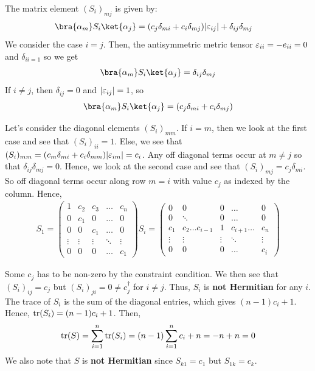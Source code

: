 \documentclass[12pt]{article}
\begin{document}
\begin{ans}
The matrix element $(S_i)_{mj}$ is given by:
\begin{align*}
    \bra{\alpha_m }S_i \ket{\alpha_j}
    &= (c_j \delta_{mi} + c_i \delta_{mj})|\e_{ij}| + \delta_{ij}\delta_{mj} 
\end{align*}
We consider the case $i =j$. Then, the antisymmetric metric tensor $\varepsilon_{ii} = -e_{ii} = 0$ and $\delta_{ii = 1}$ so we get 
\[ \bra{\alpha_m }S_i\ket{\alpha_j} = \delta_{ij}\delta_{mj}\]
If $i \neq j$, then $\delta_{ij} = 0$ and $|\varepsilon_{ij}| = 1$, so 
\[\bra{\alpha_m }S_i\ket{\alpha_j} = (c_j \delta_{mi} + c_i \delta_{mj})\]

Let's consider the diagonal elements $(S_i)_{mm}$. If $i = m$, then we look at the first case and see that $(S_i)_{ii} = 1$. Else, we see that $(S_i)_{mm} = (c_m\delta_{mi} + c_i \delta_{mm})|\varepsilon_{im}| = c_i$. Any off diagonal terms occur at $m \neq j$ so that $\delta_{ij}\delta_{mj} = 0$. Hence, we look at the second case and see that $(S_i)_{mj} = c_j \delta_{mi}$. So off diagonal terms occur along row $m = i$ with value $c_j$ as indexed by the column. Hence, 
\begin{align*}
    S_1 = \begin{pmatrix}
        1 & c_2 & c_3 & \ldots & c_n \\
        0 & c_1 & 0 & \ldots & 0 \\ 
        0 & 0 & c_1 & \ldots & 0\\
        \vdots & \vdots & \vdots & \ddots & \vdots \\
        0 & 0 & 0 & \ldots & c_1  
    \end{pmatrix}
    S_i = \begin{pmatrix}
        0 & 0 & 0 & \ldots & 0 \\
        0 & \ddots & 0 & \ldots & 0 \\ 
        c_1 & c_2\ldots c_{i - 1} & 1 & c_{i + 1}\ldots & c_n\\
        \vdots & \vdots & \vdots & \ddots & \vdots \\
        0 & 0 & 0 & \ldots & c_i  
    \end{pmatrix}
\end{align*}

Some $c_j$ has to be non-zero by the constraint condition. We then see that $(S_i)_{ij} = c_j$ but $(S_i)_{ji} = 0 \neq c_j^\dagger$ for $i \neq j$. Thus, $S_i$ is \textbf{not Hermitian} for any $i$. The trace of $S_i$ is the sum of the diagonal entries, which gives $(n - 1)c_i + 1$. Hence, $\mathrm{tr}(S_i) = (n - 1)c_i + 1$. Then, 
\[\mathrm{tr}(S) = \sum_{i = 1}^n\mathrm{tr}(S_i) = (n - 1)\sum_{i = 1}^nc_i + n = -n + n = 0\]
We also note that $S$ is \textbf{not Hermitian} since $S_{k1} = c_1$ but $S_{1k} = c_k$.
\end{ans}
\end{document}

